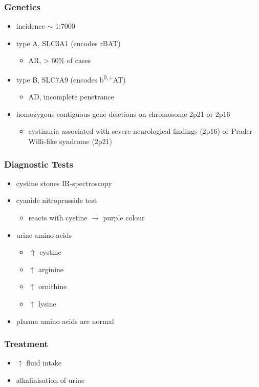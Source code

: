 \documentclass{scrartcl}
\begin{document}
\subsubsection{Genetics}
\label{sec:org5ac8f80}
\begin{itemize}
\item incidence \(\sim\) 1:7000
\item type A, SLC3A1 (encodes rBAT)
\begin{itemize}
\item AR, \textgreater{} 60\% of cases
\end{itemize}
\item type B, SLC7A9 (encodes b\textsuperscript{0,+}AT)
\begin{itemize}
\item AD, incomplete penetrance
\end{itemize}
\item homozygous contiguous gene deletions on chromosome 2p21 or 2p16
\begin{itemize}
\item cystinuria associated with severe neurological findings (2p16) or
Prader-Willi-like syndrome (2p21)
\end{itemize}
\end{itemize}

\subsubsection{Diagnostic Tests}
\label{sec:org33a7b0d}
\begin{itemize}
\item cystine stones IR-spectroscopy
\item cyanide nitroprusside test
\begin{itemize}
\item reacts with cystine \(\to\) purple colour
\end{itemize}
\item urine amino acids
\begin{itemize}
\item \(\Uparrow\) cystine
\item \(\uparrow\) arginine
\item \(\uparrow\) ornithine
\item \(\uparrow\) lysine
\end{itemize}
\item plasma amino acids are normal
\end{itemize}
\subsubsection{Treatment}
\label{sec:org73b852f}
\begin{itemize}
\item \(\uparrow\) fluid intake
\item alkalinisation of urine
\end{itemize}
\end{document}
